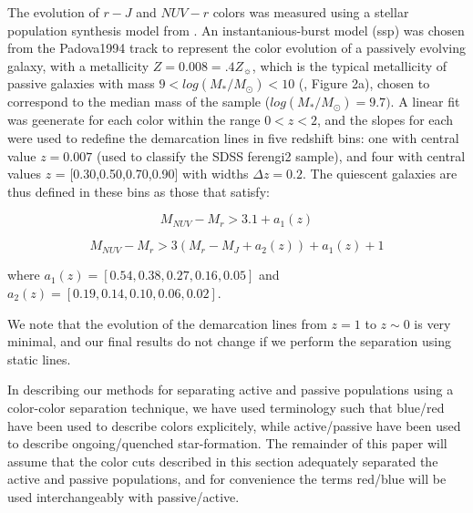 \documentclass[useAMS,usenatbib]{mn2e}
\begin{document}
The evolution of $r-J$ and $NUV-r$ colors was measured using a stellar population synthesis model from \citet{Bruzual2003}. An instantanious-burst model (ssp) was chosen from the Padova1994 track to represent the color evolution of a passively evolving galaxy, with a metallicity $Z=0.008=.4Z_{\sun}$, which is the typical metallicity of passive galaxies with mass $9 < log(M_{*}/M_{\odot}) < 10$ (\citet{Peng2015}, Figure 2a), chosen to correspond to the median mass of the sample ($log(M_{*}/M_{\odot})=9.7)$. A linear fit was geenerate for each color within the range $0<z<2$, and the slopes for each were used to redefine the demarcation lines in five redshift bins: one with central value $z=0.007$ (used to classify the SDSS ferengi2 sample), and four with central values $z$ = [0.30,0.50,0.70,0.90] with widths $\Delta z=0.2$. The quiescent galaxies are thus defined in these bins as those that satisfy:

\begin{equation}
M_{NUV}-M_{r} > 3.1 + a_{1}(z)
\end{equation}

\begin{equation}
M_{NUV}-M_{r} > 3(M_{r}-M_{J} + a_{2}(z))+ a_{1}(z) + 1  
\end{equation}

where $a_{1}(z) = [0.54,0.38,0.27,0.16,0.05]$ and $a_{2}(z) = [0.19,0.14,0.10,0.06,0.02]$. 

We note that the evolution of the demarcation lines from $z=1$ to $z\sim0$ is very minimal, and our final results do not change if we perform the separation using static lines.


In describing our methods for separating active and passive populations using a color-color separation technique, we have used terminology such that blue/red have been used to describe colors explicitely, while active/passive have been used to describe ongoing/quenched star-formation. The remainder of this paper will assume that the color cuts described in this section adequately separated the active and passive populations, and for convenience the terms red/blue will be used interchangeably with passive/active.  
\end{document}

